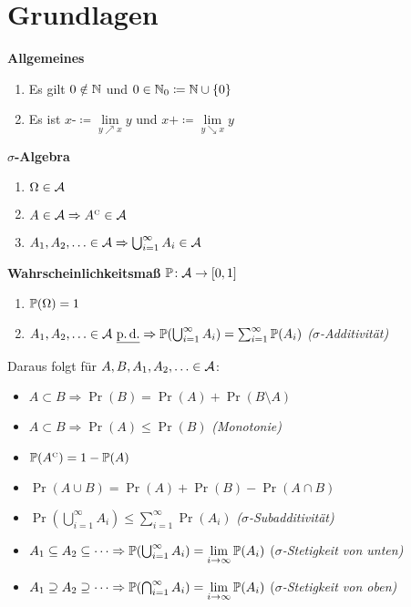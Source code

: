 \section{Grundlagen}

\textbf{Allgemeines}
\begin{enumerate}
	\item Es gilt $0\notin\mathbb{N}$ und $0\in\mathbb{N}_0\coloneqq\mathbb{N}\cup\{0\}$
	\item Es ist $x\text{-}\coloneqq\lim\limits_{y\nearrow x}y$ und $x\text{+}\coloneqq\lim\limits_{y\searrow x}y$
\end{enumerate}

\textbf{$\sigma$-Algebra}
\begin{enumerate}
\item $\Omega\in\mathcal{A}$
\item $A\in\mathcal{A} \Rightarrow A^{\text{\tiny C}}\in\mathcal{A}$
\item $A_1,A_2,\ldots\in\mathcal{A} \Rightarrow \bigcup_{i=1}^{\infty} A_i \in\mathcal{A}$
\end{enumerate}

\textbf{Wahrscheinlichkeitsmaß} $\mathbb{P}\!: \mathcal{A} \rightarrow [0,1]$
\begin{enumerate}
\item $\mathbb{P}(\Omega) = 1$
\item $A_1,A_2,\ldots\in\mathcal{A}\ \underline{\operatorname{p.d.}} \Rightarrow
  \mathbb{P}(\bigcup_{i=1}^{\infty} A_i) = \sum_{i=1}^{\infty} \mathbb{P}(A_i)$
  \hfill\textit{($\sigma$-Additivität)}
\end{enumerate}

Daraus folgt für $A,B,A_1,A_2,\ldots\in\mathcal{A}$:
\begin{itemize}
\item $A \subset B \Rightarrow \Pr(B) = \Pr(A) + \Pr(B \setminus A)$
\item $A \subset B \Rightarrow \Pr(A) \leq \Pr(B)$ \hfill\textit{(Monotonie)}
\item $\mathbb{P}(A^{\text{\tiny C}}) = 1 - \mathbb{P}(A)$
\item $\Pr(A \cup B) = \Pr(A) + \Pr(B) - \Pr(A \cap B)$
\item $\Pr(\bigcup_{i=1}^{\infty} A_i) \leq \sum_{i=1}^{\infty} \Pr(A_i)$
  \hfill\textit{($\sigma$-Subadditivität)}
\item $A_1 \subseteq A_2 \subseteq \cdots \Rightarrow
  \mathbb{P}(\bigcup_{i=1}^{\infty} A_i) = \lim\limits_{i\to\infty} \mathbb{P}(A_i)$
  \hfill(\textit{$\sigma$-Stetigkeit von unten)}
\item $A_1 \supseteq A_2 \supseteq \cdots \Rightarrow
  \mathbb{P}(\bigcap_{i=1}^{\infty} A_i) = \lim\limits_{i\to\infty} \mathbb{P}(A_i)$
  \hfill(\textit{$\sigma$-Stetigkeit von oben)}
\end{itemize}

